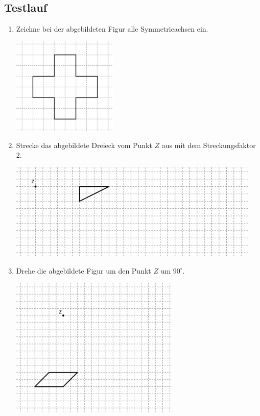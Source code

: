 \documentclass[%
11pt,%
twoside,%
titlepage,%
german,%
headsepline%
]{scrartcl}
\begin{document}

\subsection{Testlauf}
\begin{enumerate}
\item Zeichne bei der abgebildeten Figur alle Symmetrieachsen ein.
\begin{center}
\includegraphics[width=5cm]{pictures/seueb1}
\end{center}
\item Strecke das abgebildete Dreieck vom Punkt $Z$ aus mit dem Streckungsfaktor $2$.
\begin{center}
\includegraphics[width=12cm]{pictures/seueb2}
\end{center}
\item Drehe die abgebildete Figur um den Punkt $Z$ um $90^\circ$.
\begin{center}
\includegraphics[width=8cm]{pictures/seueb3}
\end{center}


\end{enumerate}
\end{document}
